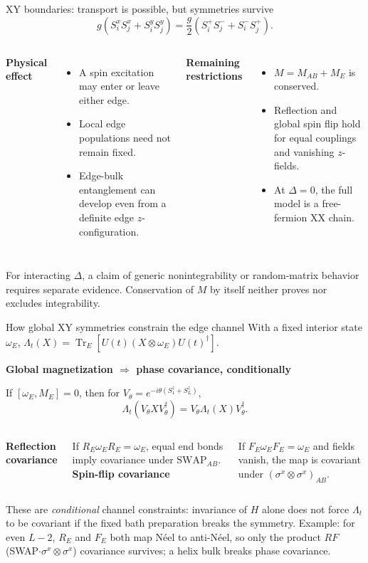 \documentclass[aspectratio=169,10pt]{beamer}
\newcommand{\Tr}{\operatorname{Tr}}
\newcommand{\sechead}[1]{{\color{sea}\bfseries #1}\par\vspace{1mm}}
\newcommand{\noteinline}[1]{{\color{muted}\footnotesize #1}}
\newcommand{\smallrule}{\par\vspace{1mm}\noindent{\color{linegray}\rule{\linewidth}{0.6pt}}\par\vspace{1mm}}
\begin{document}
\begin{frame}{XY boundaries: transport is possible, but symmetries survive}
\[
g(S_i^xS_j^x+S_i^yS_j^y)=\frac g2(S_i^+S_j^-+S_i^-S_j^+).
\]
\begin{columns}[T,onlytextwidth]
\sechead{Physical effect}
\begin{itemize}\setlength\itemsep{5pt}
\item A spin excitation may enter or leave either edge.
\item Local edge populations need not remain fixed.
\item Edge-bulk entanglement can develop even from a definite edge \(z\)-configuration.
\end{itemize}
\sechead{Remaining restrictions}
\begin{itemize}\setlength\itemsep{5pt}
\item \(M=M_{AB}+M_E\) is conserved.
\item Reflection and global spin flip hold for equal couplings and vanishing \(z\)-fields.
\item At \(\Delta=0\), the full model is a free-fermion XX chain.
\end{itemize}
\end{columns}
\smallrule
\noteinline{For interacting \(\Delta\), a claim of generic nonintegrability or random-matrix behavior requires separate evidence. Conservation of \(M\) by itself neither proves nor excludes integrability.}
\end{frame}


\begin{frame}{How global XY symmetries constrain the edge channel}
With a fixed interior state \(\omega_E\), \(\Lambda_t(X)=\Tr_E[U(t)(X\otimes\omega_E)U(t)^\dagger]\).
\par\vspace{.16cm}
\sechead{Global magnetization \(\Rightarrow\) phase covariance, conditionally}
If \([\omega_E,M_E]=0\), then for \(V_\theta=e^{-i\theta(S_1^z+S_L^z)}\),
\[
\boxed{\Lambda_t(V_\theta X V_\theta^\dagger)
=V_\theta\Lambda_t(X)V_\theta^\dagger.}
\]
\begin{columns}[T,onlytextwidth]
\sechead{Reflection covariance}
If \(R_E\omega_ER_E=\omega_E\), equal end bonds imply covariance under \(\mathrm{SWAP}_{AB}\).
\sechead{Spin-flip covariance}
If \(F_E\omega_EF_E=\omega_E\) and fields vanish, the map is covariant under \((\sigma^x\!\otimes\sigma^x)_{AB}\).
\end{columns}
\smallskip
\noteinline{These are \emph{conditional} channel constraints: invariance of \(H\) alone does not force \(\Lambda_t\) to be covariant if the fixed bath preparation breaks the symmetry. Example: for even \(L-2\), \(R_E\) and \(F_E\) both map N\'eel to anti-N\'eel, so only the product \(RF\) (SWAP\(\cdot\sigma^x\!\otimes\sigma^x\)) covariance survives; a helix bulk breaks phase covariance.}
\end{frame}
\end{document}
